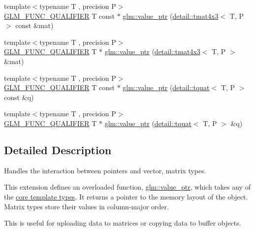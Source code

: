 \begin{DoxyCompactItemize}
\item 
{\footnotesize template$<$typename T , precision P$>$ }\\\hyperlink{setup_8hpp_a33fdea6f91c5f834105f7415e2a64407}{G\+L\+M\+\_\+\+F\+U\+N\+C\+\_\+\+Q\+U\+A\+L\+I\+F\+I\+ER} T const  $\ast$ \hyperlink{group__gtc__type__ptr_gaebe5b66d8b05f6ace85d26cedd03732d}{glm\+::value\+\_\+ptr} (\hyperlink{structglm_1_1detail_1_1tmat4x3}{detail\+::tmat4x3}$<$ T, P $>$ const \&mat)
\item 
{\footnotesize template$<$typename T , precision P$>$ }\\\hyperlink{setup_8hpp_a33fdea6f91c5f834105f7415e2a64407}{G\+L\+M\+\_\+\+F\+U\+N\+C\+\_\+\+Q\+U\+A\+L\+I\+F\+I\+ER} T $\ast$ \hyperlink{group__gtc__type__ptr_ga4a4b23867cc26441441ff4458844fa27}{glm\+::value\+\_\+ptr} (\hyperlink{structglm_1_1detail_1_1tmat4x3}{detail\+::tmat4x3}$<$ T, P $>$ \&mat)
\item 
{\footnotesize template$<$typename T , precision P$>$ }\\\hyperlink{setup_8hpp_a33fdea6f91c5f834105f7415e2a64407}{G\+L\+M\+\_\+\+F\+U\+N\+C\+\_\+\+Q\+U\+A\+L\+I\+F\+I\+ER} T const  $\ast$ \hyperlink{group__gtc__type__ptr_ga961a5b150a0ffd632aaa0252c4d6b9ab}{glm\+::value\+\_\+ptr} (\hyperlink{structglm_1_1detail_1_1tquat}{detail\+::tquat}$<$ T, P $>$ const \&q)
\item 
{\footnotesize template$<$typename T , precision P$>$ }\\\hyperlink{setup_8hpp_a33fdea6f91c5f834105f7415e2a64407}{G\+L\+M\+\_\+\+F\+U\+N\+C\+\_\+\+Q\+U\+A\+L\+I\+F\+I\+ER} T $\ast$ \hyperlink{group__gtc__type__ptr_gab72389186ae9e8c822ff6cc9b474a37f}{glm\+::value\+\_\+ptr} (\hyperlink{structglm_1_1detail_1_1tquat}{detail\+::tquat}$<$ T, P $>$ \&q)
\end{DoxyCompactItemize}


\subsection{Detailed Description}
Handles the interaction between pointers and vector, matrix types. 

This extension defines an overloaded function, \hyperlink{group__gtc__type__ptr_gaf019636bb8bd7c9efb7c7ce3bb23bcfc}{glm\+::value\+\_\+ptr}, which takes any of the \hyperlink{group__core__template}{core template types}. It returns a pointer to the memory layout of the object. Matrix types store their values in column-\/major order.

This is useful for uploading data to matrices or copying data to buffer objects.

